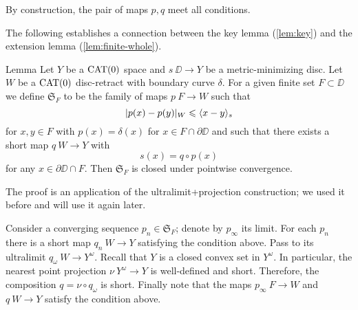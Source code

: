By construction, the pair of maps $p,q$ meet all conditions.
\qeds

The following establishes a connection between the 
key lemma (\ref{lem:key}) and the extension lemma (\ref{lem:finite-whole}).

\begin{thm}{Lemma}\label{lem:S-closed}
Let $Y$ be a $\mathop{\rm CAT}\nolimits(0)$ space and $s\:\DD\to Y$ 
be a metric-minimizing disc. Let $W$ be a
$\mathop{\rm CAT}\nolimits(0)$ disc-retract with boundary curve $\delta$. For a given 
finite set $F\subset \DD$ we define $\mathfrak{S}_F$ to be the family of maps  
 $p\:F\to W$ such that
\[|p(x)-p(y)|_W\leqslant \langle x-y\rangle_s\] 
for $x,y\in F$ with $p(x)=\delta(x)$ for $x\in F\cap \partial\DD$ and such that there exists
a short map $q\:W\to Y$ with
\[s(x)=q\circ p(x)\] 
for any $x\in\partial\DD\cap F$.
Then $\mathfrak{S}_F$ is closed under pointwise convergence. 
\end{thm}

The proof is an application of the ultralimit+projection construction;
we used it before and will use it again later.

Consider a converging sequence $p_n\in  \mathfrak{S}_F$;
denote by $p_\infty$ its limit.
For each $p_n$ there is a short map $q_n\:W\to Y$ satisfying the condition above.
Pass to its ultralimit $q_\omega\:W\to Y^\omega$.
Recall that $Y$ is a closed convex set in $Y^\omega$.
In particular, the nearest point projection $\nu\:Y^\omega\to Y$ is well-defined and short.
Therefore, the composition $q=\nu\circ q_\omega$ is short.
Finally note that the maps $p_\infty\:F\to W$ and $q\:W\to Y$ satisfy the condition above.
\qeds


